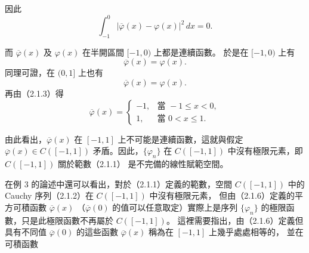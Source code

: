 \documentclass[11pt,a4paper,twoside]{article}
\newif\ifstudynotes
\newcommand{\StudyNote}[2]{%
    \ifstudynotes
    \begin{studyNote}[title={#1}]
    #2
    \end{studyNote}
    \fi
}
\newcommand{\pnum}[1]{%
    \makebox[0pt][r]{%
        \scriptsize\textbf{[#1]}\hspace{0.7em}%
    }%
}
\begin{document}
因此
\[
    \int_{-1}^{0}
    |\overline{\varphi}(x)-\varphi(x)|^2\,dx
    =
    0.
\]

\noindent
\pnum{40}
而 $\overline{\varphi}(x)$ 及 $\varphi(x)$ 在半開區間 $[-1,0)$ 上都是連續函數。
於是在 $[-1,0)$ 上有
                \[
                    \overline{\varphi}(x)=\varphi(x).
                \]
                同理可證，在 $(0,1]$ 上也有
\[
    \overline{\varphi}(x)=\varphi(x).
\]
再由（2.1.3）得
\begin{equation}
    \overline{\varphi}(x)
    =
    \begin{cases}
        -1, & \text{當 }-1\leq x<0, \\
        1,  & \text{當 }0<x\leq 1.
    \end{cases}
    \tag{2.1.6}
\end{equation}

\noindent
\pnum{41}
由此看出，$\overline{\varphi}(x)$ 在 $[-1,1]$ 上不可能是連續函數，這就與假定
$\overline{\varphi}(x)\in C([-1,1])$ 矛盾。因此，$\{\varphi_n\}$ 在
$C([-1,1])$ 中沒有極限元素，即 $C([-1,1])$ 關於範數（2.1.1）
是不完備的線性賦範空間。
\StudyNote{複習註解：為什麼 $\overline{\varphi}(0)$ 可以任意取？}{
    在 $L^2$ 中，函數的距離由積分決定。
    如果兩個函數只在單一點 $x=0$ 不同，因為單點集合的測度為零，
    所以這個差異不會影響積分。

    因此，即使改變 $\overline{\varphi}(0)$ 的值，仍有相同的 $L^2$ 元素。
    這就是「幾乎處處相等」的概念：
    \[
        f=g\quad\text{a.e.}
    \]
    表示 $f$、$g$ 只在一個測度為零的集合上可能不同。

    所以在 $L^p$ 空間中，更精確地說，元素不是某一個單獨的函數，
    而是由「幾乎處處相等」所形成的函數等價類。
}
\noindent
\pnum{42}
在例 3 的論述中還可以看出，對於（2.1.1）定義的範數，空間
$C([-1,1])$ 中的 Cauchy 序列（2.1.2）在 $C([-1,1])$ 中沒有極限元素，
但由（2.1.6）定義的平方可積函數 $\overline{\varphi}(x)$
（$\overline{\varphi}(0)$ 的值可以任意取定）實際上是序列
$\{\varphi_n\}$ 的極限函數，只是此極限函數不再屬於 $C([-1,1])$。
這裡需要指出，由（2.1.6）定義但具有不同值 $\overline{\varphi}(0)$
的這些函數 $\overline{\varphi}(x)$ 稱為在 $[-1,1]$ 上幾乎處處相等的，
並在可積函數
\StudyNote{複習註解：什麼是完備化？}{
    完備化的核心思想是：
    若空間 $V$ 中存在 Cauchy 序列，但它的極限不在 $V$ 中，
    就把這些缺少的極限補進來，使新空間成為完備空間。

    這和
    \[
        \mathbb{Q}\longrightarrow\mathbb{R}
    \]
    的想法相同：有理數中有些 Cauchy 序列的極限不是有理數，
    補入這些缺少的極限後得到實數。

    若兩個 Cauchy 序列 $\{\varphi_n\}$、$\{\varphi_n'\}$ 滿足
    \[
        \|\varphi_n-\varphi_n'\|\to0,
    \]
    則它們代表同一個新極限元素，而不是兩個不同的新元素。

    對這個新元素 $\varphi$，定義
    \[
        \|\varphi\|
        =
        \lim_{n\to\infty}\|\varphi_n\|.
    \]

    因此可以記成
    \[
        \boxed{
            \text{完備化}
            =
            \text{把所有 Cauchy 序列缺少的極限補進來}
        }.
    \]
}
\end{document}
